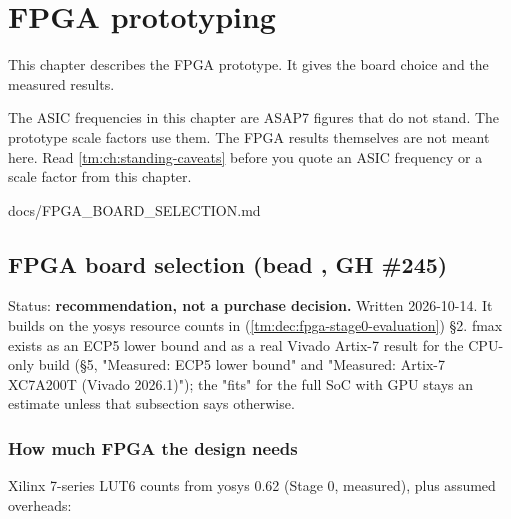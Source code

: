 \chapter{FPGA prototyping}\label{tm:ch:fpga-prototyping}

This chapter describes the FPGA prototype. It gives the board choice and the measured results.

\begin{information}
The ASIC frequencies in this chapter are ASAP7 figures that do not stand. The prototype scale factors use them. The FPGA results themselves are not meant here. Read \cref{tm:ch:standing-caveats} before you quote an ASIC frequency or a scale factor from this chapter.
\end{information}

\begin{relocated}{docs/FPGA_BOARD_SELECTION.md}
\section{\texorpdfstring{FPGA board selection (bead , GH
\#245)}{FPGA board selection (bead , GH \#245)}}\label{tm:dec:fpga-board-selection}

Status: \textbf{recommendation, not a purchase decision.} Written
2026-10-14. It builds on the yosys resource counts in
 (\cref{tm:dec:fpga-stage0-evaluation})
§2. fmax exists as an ECP5 lower bound and as a real Vivado Artix-7
result for the CPU-only build (§5, "Measured: ECP5 lower bound" and
"Measured: Artix-7 XC7A200T (Vivado 2026.1)"); the "fits" for the full
SoC with GPU stays an estimate unless that subsection says otherwise.

\subsection{How much FPGA the design needs}\label{tm:dec:fpga-board-selection:1-how-much-fpga-the-design-needs}

Xilinx 7-series LUT6 counts from yosys 0.62  (Stage
0, measured), plus assumed overheads:

{\small\setlength{\tabcolsep}{4pt}

}
\end{relocated}
